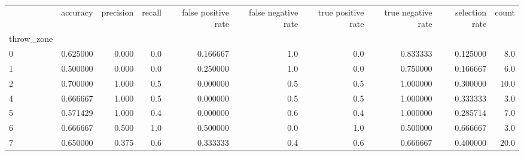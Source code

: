\begin{tabular}{lrrrrrrrrr}
\toprule
{} &  accuracy &  precision &  recall &  false positive rate &  false negative rate &  true positive rate &  true negative rate &  selection rate &  count \\
throw\_zone &           &            &         &                      &                      &                     &                     &                 &        \\
\midrule
0          &  0.625000 &      0.000 &     0.0 &             0.166667 &                  1.0 &                 0.0 &            0.833333 &        0.125000 &    8.0 \\
1          &  0.500000 &      0.000 &     0.0 &             0.250000 &                  1.0 &                 0.0 &            0.750000 &        0.166667 &    6.0 \\
2          &  0.700000 &      1.000 &     0.5 &             0.000000 &                  0.5 &                 0.5 &            1.000000 &        0.300000 &   10.0 \\
4          &  0.666667 &      1.000 &     0.5 &             0.000000 &                  0.5 &                 0.5 &            1.000000 &        0.333333 &    3.0 \\
5          &  0.571429 &      1.000 &     0.4 &             0.000000 &                  0.6 &                 0.4 &            1.000000 &        0.285714 &    7.0 \\
6          &  0.666667 &      0.500 &     1.0 &             0.500000 &                  0.0 &                 1.0 &            0.500000 &        0.666667 &    3.0 \\
7          &  0.650000 &      0.375 &     0.6 &             0.333333 &                  0.4 &                 0.6 &            0.666667 &        0.400000 &   20.0 \\
\bottomrule
\end{tabular}
